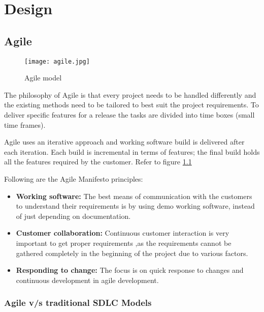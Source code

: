 \chapter{Design}


\section{Agile}

\begin{figure}[h!]
    \begin{center}
        \texttt{[image: agile.jpg]}
    \end{center}
    \caption{Agile model}
    \label{fig:agile}
\end{figure}

The philosophy of Agile is that every project needs to be handled differently and the existing methods
need to be tailored to best suit the project requirements. To deliver specific features for a 
release the tasks are divided into time boxes (small time frames).

Agile uses an iterative approach and  working software build is delivered after each iteration. 
Each build is incremental in terms of features; the final build holds all the features required 
by the customer. Refer to figure \ref{fig:agile}

Following are the Agile Manifesto principles:

\begin{itemize}
    \item \textbf{Working software:} The best means of communication with the customers to understand
    their requirements is by using demo working software, instead of just depending on documentation.
     
    \item \textbf{Customer collaboration:} Continuous customer interaction is very important to get proper
    requirements ,as the requirements cannot be gathered completely in the beginning of the project due 
    to various factors.

    \item \textbf{Responding to change:} The focus is on quick response to changes and 
    continuous development in agile development.
\end{itemize}

\subsection{Agile v/s traditional SDLC Models}

